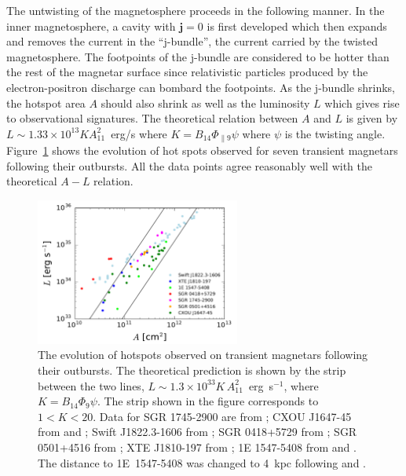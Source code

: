 The untwisting of the magnetosphere proceeds in the following manner.
In the inner magnetosphere, a cavity with $\boldsymbol{j}=0$ is first developed which then expands and removes the current in the ``j-bundle'', the current carried by the twisted magnetosphere.
The footpoints of the j-bundle are considered to be hotter than the rest of the magnetar surface since relativistic particles produced by the electron-positron discharge can bombard the footpoints.
As the j-bundle shrinks, the hotspot area $A$ should also shrink as well as the luminosity $L$ which gives rise to observational signatures.
The theoretical relation between $A$ and $L$ is given by $L\sim 1.33\times 10^{13} K A_{11}^2$~erg/s where $K = B_{14}\Phi_{\parallel 9}\psi$ where $\psi$ is the twisting angle.
Figure~\ref{fig:hot-spot} shows the evolution of hot spots observed for seven transient magnetars following their outbursts.
All the data points agree reasonably well with the theoretical $A-L$ relation.
%
\begin{figure}[h]
  \centering
  \includegraphics[width=0.6\textwidth]{pics/intro/hot-spot.png}
  \caption[The evolution of hotspots observed on transient magnetars following their outbursts]{The evolution of hotspots observed on transient magnetars following their outbursts. 
The theoretical prediction is shown by the strip between the two lines, 
$L \sim 1.3 \times 10^{33} K\,A_{11}^2$~erg~s$^{-1}$, where $K=B_{14} \Phi_9 \psi$.
The strip shown in the figure corresponds to $1<K<20$. Data for SGR 1745-2900 are 
from \citet{2015MNRAS.449.2685C};
CXOU J1647-45 from \citet{2011ApJ...726...37W} and \citet{2013ApJ...763...82A};
Swift J1822.3-1606 from \citet{2012ApJ...754...27R};
SGR 0418+5729 from \citet{2010MNRAS.405.1787E};
SGR 0501+4516 from \citet{2009MNRAS.396.2419R};
XTE J1810-197 from \citet{2007Ap&SS.308...79G};
1E 1547-5408 from \citet{2008ApJ...676.1178H} and \citet{2010PASJ...62..475E}.
The distance to 1E~1547-5408 was changed to 4~kpc following  
\citet{2010ApJ...710..227T} and \citet{2007ApJ...667.1111G}.
}
  \label{fig:hot-spot}
\end{figure}
%

